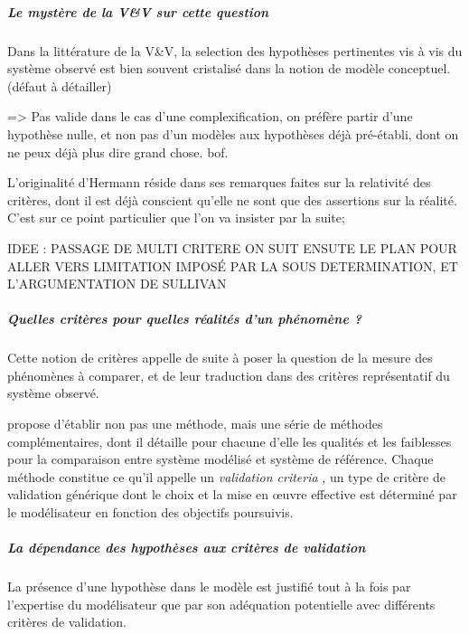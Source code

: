 \subparagraph{Le mystère de la V\&V sur cette question}

Dans la littérature de la V\&V, la selection des hypothèses pertinentes vis à vis du système observé est bien souvent cristalisé dans la notion de modèle conceptuel. (défaut à détailler) 

=> Pas valide dans le cas d'une complexification, on préfère partir d'une hypothèse nulle, et non pas d'un modèles aux hypothèses déjà pré-établi, dont on ne peux déjà plus dire grand chose. bof.


L'originalité d'Hermann réside dans ses remarques faites sur la relativité des critères, dont il est déjà conscient qu'elle ne sont que des assertions sur la réalité.  C'est sur ce point particulier que l'on va insister par la suite;


IDEE : PASSAGE DE MULTI CRITERE ON SUIT ENSUTE LE PLAN POUR ALLER VERS LIMITATION IMPOSÉ PAR LA SOUS DETERMINATION, ET L'ARGUMENTATION DE SULLIVAN

\subparagraph{Quelles critères pour quelles réalités d'un phénomène ? }

Cette notion de critères appelle de suite à poser la question de la mesure des phénomènes à comparer, et de leur traduction dans des critères représentatif du système observé.

\textcite{Hermann1967, Hermann1967b} propose d'établir non pas une méthode, mais une série de méthodes complémentaires, dont il détaille pour chacune d'elle les qualités et les faiblesses pour la comparaison entre système modélisé et système de référence. Chaque méthode constitue ce qu'il appelle un \textit{validation criteria} , un type de critère de validation générique dont le choix et la mise en œuvre effective est déterminé par le modélisateur en fonction des objectifs poursuivis.

\subparagraph{La dépendance des hypothèses aux critères de validation}


La présence d'une hypothèse dans le modèle est justifié tout à la fois par l'expertise du modélisateur que par son adéquation potentielle avec différents critères de validation. 


